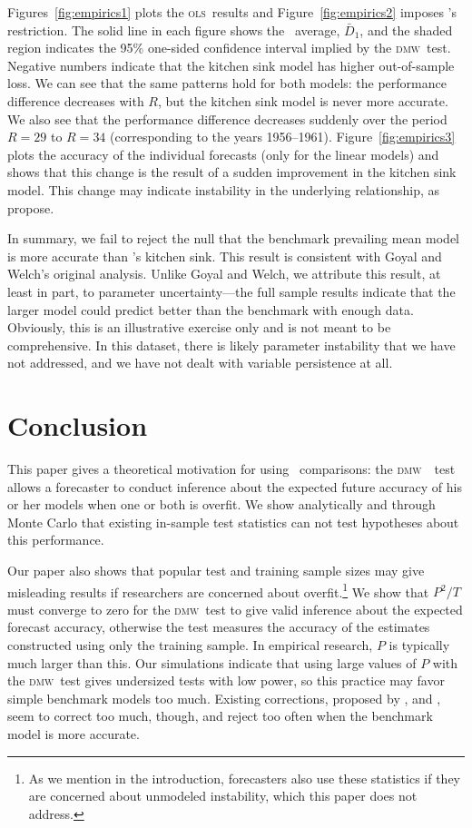 \documentclass[11pt]{article}
\newcommand{\citepos}[1]{\citeauthor{#1}'s \citeyearpar{#1}}
\newcommand{\dmw}{\textsc{dmw}}
\newcommand{\ols}{\textsc{ols}}
\begin{document}
Figures~\ref{fig:empirics1} plots the \ols\ results and
Figure~\ref{fig:empirics2} imposes \citepos{CaT:08} restriction.  The
solid line in each figure shows the \oos\ average, $\bar D_1$, and the
shaded region indicates the 95\% one-sided confidence interval implied
by the \dmw\ test.  Negative numbers indicate that the kitchen sink
model has higher out-of-sample loss.  We can see that the same
patterns hold for both models: the performance difference decreases
with $R$, but the kitchen sink model is never more accurate.  We also
see that the performance difference decreases suddenly over the period
$R=29$ to $R=34$ (corresponding to the years 1956--1961).
Figure~\ref{fig:empirics3} plots the accuracy of the individual
forecasts (only for the linear models) and shows that this change is
the result of a sudden improvement in the kitchen sink model.  This
change may indicate instability in the underlying relationship, as
\citet{GoW:08} propose.

In summary, we fail to reject the null that the benchmark prevailing
mean model is more accurate than \citepos{GoW:08} kitchen sink.  This
result is consistent with Goyal and Welch's original analysis.  Unlike
Goyal and Welch, we attribute this result, at least in part, to
parameter uncertainty---the full sample results indicate that the
larger model could predict better than the benchmark with enough data.
Obviously, this is an illustrative exercise only and is not meant to
be comprehensive.  In this dataset, there is likely parameter
instability that we have not addressed, and we have not dealt with
variable persistence at all.
\section{Conclusion}\label{sec:conclusion}
This paper gives a theoretical motivation for using \oos\ comparisons:
the \dmw\ \oos\ test allows a forecaster to conduct inference about
the expected future accuracy of his or her models when one or both is
overfit.  We show analytically and through Monte Carlo that existing
in-sample test statistics can not test hypotheses about this
performance.

Our paper also shows that popular test and training sample sizes may
give misleading results if researchers are concerned about
overfit.\footnote{As we mention in the introduction, forecasters also
  use these statistics if they are concerned about unmodeled
  instability, which this paper does not address.}  We show that
$P^2/T$ must converge to zero for the \dmw\ test to give valid
inference about the expected forecast accuracy, otherwise the test
measures the accuracy of the estimates constructed using only the
training sample.  In empirical research, $P$ is typically much larger
than this.  Our simulations indicate that using large values of $P$
with the \dmw\ test gives undersized tests with low power, so this
practice may favor simple benchmark models too much.  Existing
corrections, proposed by \citet{ClM:01,ClM:05}, \citet{Mcc:07} and
\citet{ClW:06,ClW:07}, seem to correct too much, though, and reject
too often when the benchmark model is more accurate.
\end{document}
